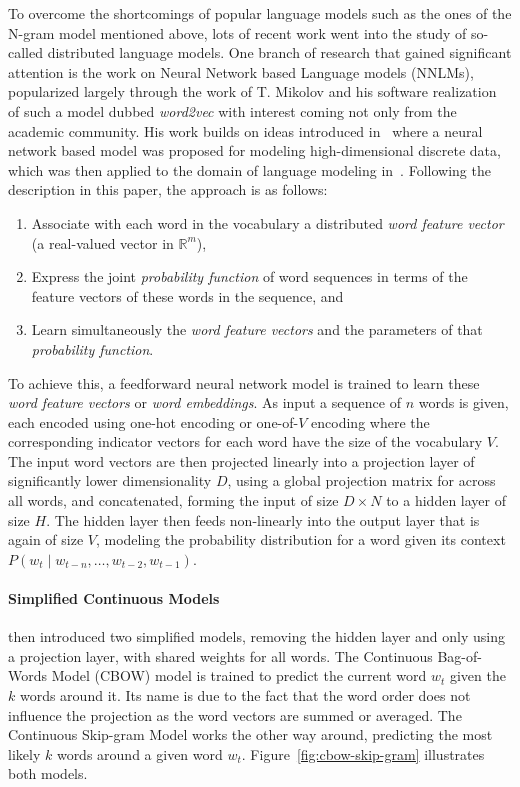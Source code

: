To overcome the shortcomings of popular language models such as the ones of the N-gram model mentioned above, lots of recent work went into the study of so-called distributed language models. One branch of research that gained significant attention is the work on Neural Network based Language models (NNLMs), popularized largely through the work of T. Mikolov and his software realization of such a model dubbed \emph{word2vec} with interest coming not only from the academic community. His work builds on ideas introduced in~\cite{Bengio:2000aa} where a neural network based model was proposed for modeling high-dimensional discrete data, which was then applied to the domain of language modeling in~\cite{bengio2003neural}. Following the description in this paper, the approach is as follows:

\begin{enumerate}
  \item Associate with each word in the vocabulary a distributed \emph{word feature vector} (a real-valued vector in $\mathbb{R}^m$),
  \item Express the joint \emph{probability function} of word sequences in terms of the feature vectors of these words in the sequence, and
  \item Learn simultaneously the \emph{word feature vectors} and the parameters of that \emph{probability function}.
\end{enumerate}

To achieve this, a feedforward neural network model is trained to learn these \emph{word feature vectors} or \emph{word embeddings}. As input a sequence of $n$ words is given, each encoded using one-hot encoding or one-of-$V$ encoding where the corresponding indicator vectors for each word have the size of the vocabulary $V$. The input word vectors are then projected linearly into a projection layer of significantly lower dimensionality $D$, using a global projection matrix for across all words, and concatenated, forming the input of size $D \times N$ to a hidden layer of size $H$. The hidden layer then feeds non-linearly into the output layer that is again of size $V$, modeling the probability distribution for a word given its context $P(w_t \mid w_{t - n}, \ldots, w_{t - 2}, w_{t - 1})$.

\paragraph{Simplified Continuous Models}

\cite{Mikolov:2013ad} then introduced two simplified models, removing the hidden layer and only using a projection layer, with shared weights for all words. The Continuous Bag-of-Words Model (CBOW) model is trained to predict the current word $w_t$ given the $k$ words around it. Its name is due to the fact that the word order does not influence the projection as the word vectors are summed or averaged. The Continuous Skip-gram Model works the other way around, predicting the most likely $k$ words around a given word $w_t$. Figure~\ref{fig:cbow-skip-gram} illustrates both models.


